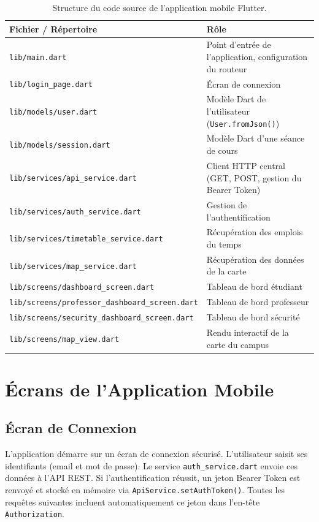 \documentclass[12pt, a4paper]{report}
\begin{document}
\begin{table}[H]
\centering
\renewcommand{\arraystretch}{1.3}
\begin{tabularx}{\textwidth}{l X}
\toprule
\textbf{Fichier / Répertoire} & \textbf{Rôle} \\
\midrule
\texttt{lib/main.dart} & Point d'entrée de l'application, configuration du routeur \\
\texttt{lib/login\_page.dart} & Écran de connexion \\
\texttt{lib/models/user.dart} & Modèle Dart de l'utilisateur (\texttt{User.fromJson()}) \\
\texttt{lib/models/session.dart} & Modèle Dart d'une séance de cours \\
\texttt{lib/services/api\_service.dart} & Client HTTP central (GET, POST, gestion du Bearer Token) \\
\texttt{lib/services/auth\_service.dart} & Gestion de l'authentification \\
\texttt{lib/services/timetable\_service.dart} & Récupération des emplois du temps \\
\texttt{lib/services/map\_service.dart} & Récupération des données de la carte \\
\texttt{lib/screens/dashboard\_screen.dart} & Tableau de bord étudiant \\
\texttt{lib/screens/professor\_dashboard\_screen.dart} & Tableau de bord professeur \\
\texttt{lib/screens/security\_dashboard\_screen.dart} & Tableau de bord sécurité \\
\texttt{lib/screens/map\_view.dart} & Rendu interactif de la carte du campus \\
\bottomrule
\end{tabularx}
\caption{Structure du code source de l'application mobile Flutter.}
\end{table}

\section{Écrans de l'Application Mobile}

\subsection{Écran de Connexion}

L'application démarre sur un écran de connexion sécurisé. L'utilisateur saisit ses identifiants (email et mot de passe). Le service \texttt{auth\_service.dart} envoie ces données à l'API REST. Si l'authentification réussit, un jeton Bearer Token est renvoyé et stocké en mémoire via \texttt{ApiService.setAuthToken()}. Toutes les requêtes suivantes incluent automatiquement ce jeton dans l'en-tête \texttt{Authorization}.
\end{document}
